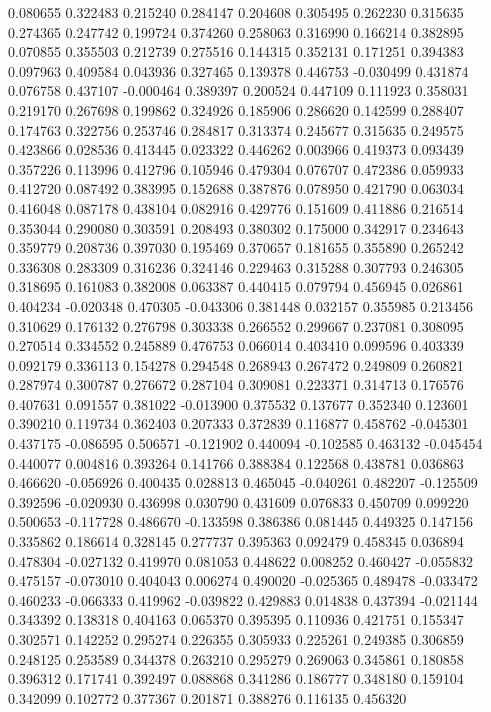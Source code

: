 0.080655
0.322483
0.215240
0.284147
0.204608
0.305495
0.262230
0.315635
0.274365
0.247742
0.199724
0.374260
0.258063
0.316990
0.166214
0.382895
0.070855
0.355503
0.212739
0.275516
0.144315
0.352131
0.171251
0.394383
0.097963
0.409584
0.043936
0.327465
0.139378
0.446753
-0.030499
0.431874
0.076758
0.437107
-0.000464
0.389397
0.200524
0.447109
0.111923
0.358031
0.219170
0.267698
0.199862
0.324926
0.185906
0.286620
0.142599
0.288407
0.174763
0.322756
0.253746
0.284817
0.313374
0.245677
0.315635
0.249575
0.423866
0.028536
0.413445
0.023322
0.446262
0.003966
0.419373
0.093439
0.357226
0.113996
0.412796
0.105946
0.479304
0.076707
0.472386
0.059933
0.412720
0.087492
0.383995
0.152688
0.387876
0.078950
0.421790
0.063034
0.416048
0.087178
0.438104
0.082916
0.429776
0.151609
0.411886
0.216514
0.353044
0.290080
0.303591
0.208493
0.380302
0.175000
0.342917
0.234643
0.359779
0.208736
0.397030
0.195469
0.370657
0.181655
0.355890
0.265242
0.336308
0.283309
0.316236
0.324146
0.229463
0.315288
0.307793
0.246305
0.318695
0.161083
0.382008
0.063387
0.440415
0.079794
0.456945
0.026861
0.404234
-0.020348
0.470305
-0.043306
0.381448
0.032157
0.355985
0.213456
0.310629
0.176132
0.276798
0.303338
0.266552
0.299667
0.237081
0.308095
0.270514
0.334552
0.245889
0.476753
0.066014
0.403410
0.099596
0.403339
0.092179
0.336113
0.154278
0.294548
0.268943
0.267472
0.249809
0.260821
0.287974
0.300787
0.276672
0.287104
0.309081
0.223371
0.314713
0.176576
0.407631
0.091557
0.381022
-0.013900
0.375532
0.137677
0.352340
0.123601
0.390210
0.119734
0.362403
0.207333
0.372839
0.116877
0.458762
-0.045301
0.437175
-0.086595
0.506571
-0.121902
0.440094
-0.102585
0.463132
-0.045454
0.440077
0.004816
0.393264
0.141766
0.388384
0.122568
0.438781
0.036863
0.466620
-0.056926
0.400435
0.028813
0.465045
-0.040261
0.482207
-0.125509
0.392596
-0.020930
0.436998
0.030790
0.431609
0.076833
0.450709
0.099220
0.500653
-0.117728
0.486670
-0.133598
0.386386
0.081445
0.449325
0.147156
0.335862
0.186614
0.328145
0.277737
0.395363
0.092479
0.458345
0.036894
0.478304
-0.027132
0.419970
0.081053
0.448622
0.008252
0.460427
-0.055832
0.475157
-0.073010
0.404043
0.006274
0.490020
-0.025365
0.489478
-0.033472
0.460233
-0.066333
0.419962
-0.039822
0.429883
0.014838
0.437394
-0.021144
0.343392
0.138318
0.404163
0.065370
0.395395
0.110936
0.421751
0.155347
0.302571
0.142252
0.295274
0.226355
0.305933
0.225261
0.249385
0.306859
0.248125
0.253589
0.344378
0.263210
0.295279
0.269063
0.345861
0.180858
0.396312
0.171741
0.392497
0.088868
0.341286
0.186777
0.348180
0.159104
0.342099
0.102772
0.377367
0.201871
0.388276
0.116135
0.456320
